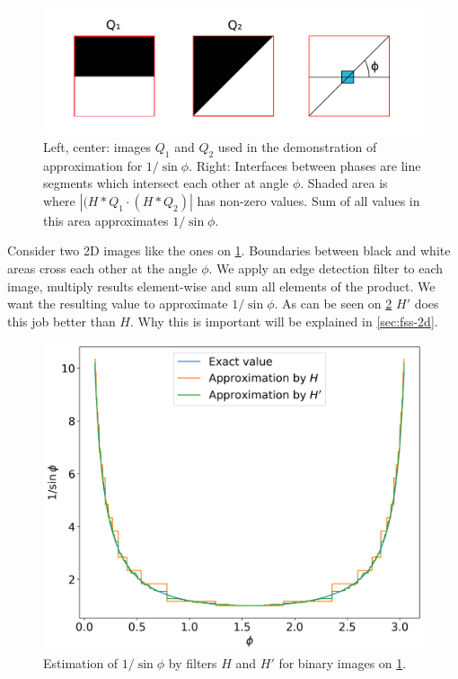 \documentclass[preprint]{elsarticle}
\begin{document}
\begin{figure}
  \centering
  \includegraphics[width=0.8\linewidth]{images/experiment-setup.png}
  \caption[]{Left, center: images $Q_1$ and $Q_2$ used in the demonstration of
    approximation for $1 / \sin \phi$. Right: Interfaces between phases are
    line segments which intersect each other at angle $\phi$. Shaded area is
    where $|(H*Q_1\cdot(H*Q_2)|$ has non-zero values. Sum of all values in this
    area approximates $1 / \sin \phi$.}
  \label{fig:experiment-setup}
\end{figure}
Consider two 2D images like the ones on \cref{fig:experiment-setup}. Boundaries
between black and white areas cross each other at the angle $\phi$. We apply an
edge detection filter to each image, multiply results element-wise and sum all
elements of the product. We want the resulting value to approximate
$1/\sin \phi$. As can be seen on \cref{fig:filter-comparison} $H'$ does this job
better than $H$. Why this is important will be explained in \cref{sec:fss-2d}.
\begin{figure}
  \centering
  \includegraphics[width=0.8\linewidth]{images/filter-comparison.png}
  \caption[]{Estimation of $1/\sin\phi$ by filters $H$ and $H'$ for binary
    images on \cref{fig:experiment-setup}.}
  \label{fig:filter-comparison}
\end{figure}
\end{document}
